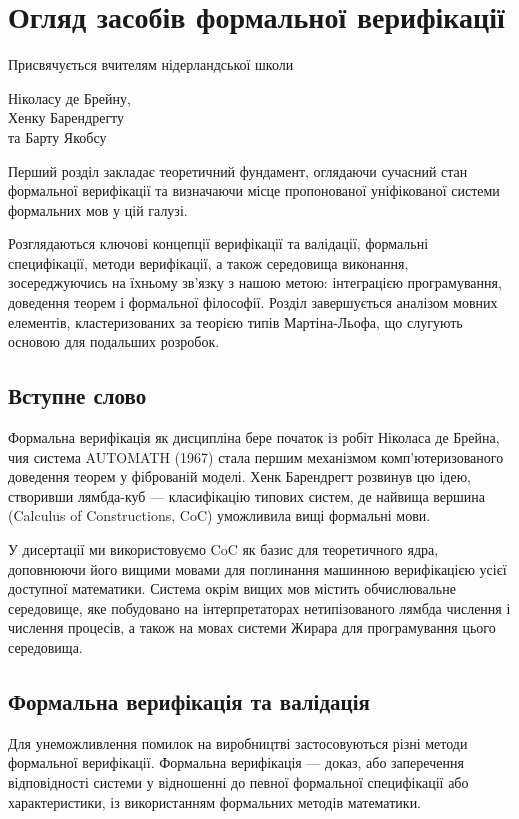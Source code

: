 \chapter{Огляд засобів формальної верифікації}
\epigraph{Присвячується вчителям нідерландської школи}{Ніколасу де Брейну, \\ Хенку Барендрегту \\ та Барту Якобсу}

Перший розділ закладає теоретичний фундамент, оглядаючи сучасний
стан формальної верифікації та визначаючи місце пропонованої
уніфікованої системи формальних мов у цій галузі.

Розглядаються ключові концепції верифікації та валідації, формальні
специфікації, методи верифікації, а також середовища виконання,
зосереджуючись на їхньому зв’язку з нашою метою: інтеграцією програмування,
доведення теорем і формальної філософії. Розділ завершується аналізом
мовних елементів, кластеризованих за теорією типів Мартіна-Льофа,
що слугують основою для подальших розробок.

\section*{Вступне слово}
Формальна верифікація як дисципліна бере початок із робіт Ніколаса де Брейна,
чия система AUTOMATH (1967) стала першим механізмом комп’ютеризованого
доведення теорем у фіброваній моделі. Хенк Барендрегт розвинув цю ідею,
створивши лямбда-куб — класифікацію типових систем, де найвища
вершина (Calculus of Constructions, CoC) уможливила вищі формальні мови.

У дисертації ми використовуємо CoC як базис для теоретичного ядра, доповнюючи його
вищими мовами для поглинання машинною верифікацією усієї доступної математики.
Система окрім вищих мов містить обчислювальне середовище, яке побудовано на
інтерпретаторах нетипізованого лямбда числення і числення процесів, а також
на мовах системи Жирара для програмування цього середовища.

\section{Формальна верифікація та валідація}
Для унеможливлення помилок на виробництві застосовуються різні
методи формальної верифікації. Формальна верифікація — доказ, або заперечення
відповідності системи у відношенні до певної формальної специфікації або характеристики,
із використанням формальних методів математики.

